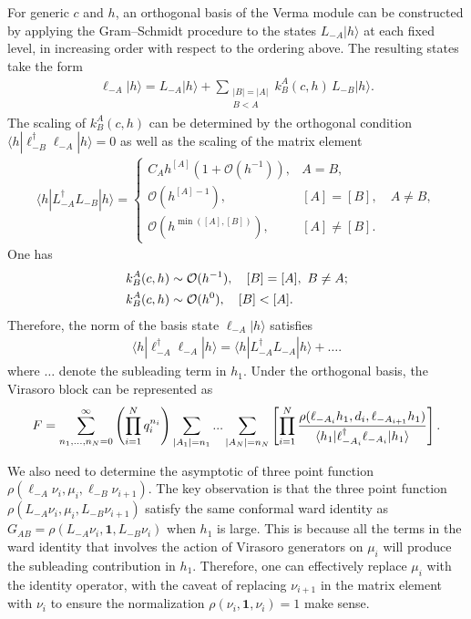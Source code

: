 \documentclass[12pt]{article}
\newcommand{\ie}{\begin{equation}\begin{aligned}}
\newcommand{\fe}{\end{aligned}\end{equation}}
\numberwithin{equation}{section}
\begin{document}
For generic $c$ and $h$, an orthogonal basis of the Verma module
can be constructed by applying the Gram--Schmidt procedure to the
states $L_{-A}|h\rangle$ at each fixed level, in increasing order
with respect to the ordering above. The resulting states take the form
\ie\label{orthob}
\ell_{-A}|h\rangle
=
L_{-A}|h\rangle
+
\sum_{\substack{|B|=|A|\\ B<A}}
k^A_B(c,h)\,L_{-B}|h\rangle.
\fe
The scaling of $k^A_B(c,h)$ can be determined by the orthogonal condition $\langle h| \ell_{-B}^\dagger \ell_{-A} |h\rangle =0$ as well as the scaling of the matrix element 
\ie\label{gram-scaling}
\langle h|L_{-A}^{\dagger}L_{-B}|h\rangle
=
\begin{cases}
C_A h^{[A]}\left(1+\mathcal{O}(h^{-1})\right),
& A=B,\\[4pt]
\mathcal{O}\!\left(h^{[A]-1}\right),
& [A]=[B],\quad A\neq B,\\[4pt]
\mathcal{O}\!\left(h^{\min([A],[B])}\right),
& [A]\neq[B].
\end{cases}
\fe
One has
\ie\label{kscaling}
&k^A_B(c,h) \sim {\cal O}(h^{-1}),~~~ [B]=[A],~B\not=A;
\\
& k^A_B(c,h) \sim {\cal O}(h^0),~~~ [B]<[A].
\fe
Therefore, the norm of the basis state $\ell_{-A}|h\rangle$ satisfies
\ie
\langle h| \ell_{-A}^\dagger \ell_{-A} |h\rangle =\langle h| L_{-A}^\dagger L_{-A} |h\rangle +\dots.
\fe
where $\dots$ denote the subleading term in $h_1$. Under the orthogonal basis, the Virasoro block can be represented as 
\ie\label{hlimit}
F= \sum_{n_1,...,n_N=0}^{\infty}\left(\prod_{i=1}^{N}q_i^{n_i}\right)\sum_{|A_1|=n_1}...\sum_{|A_N|=n_N}\left[\prod_{i=1}^N{\rho(\ell_{-A_i}h_1,d_i,\ell_{-A_{i+1}}h_1)\over\langle h_1|\ell_{-A_i}^\dag\ell_{-A_i}|h_1\rangle}\right].
\fe

We also need to determine the asymptotic of three point function  $\rho(\ell_{-A}\nu_i,\mu_i,\ell_{-B}\nu_{i+1})$. The key observation is that the three point function $\rho(L_{-A}\nu_i,\mu_i,L_{-B}\nu_{i+1})$ satisfy the same conformal ward identity as $G_{AB}=\rho(L_{-A}\nu_i,\mathbf{1},L_{-B}\nu_{i})$  when $h_1$ is large. This is because all the terms in the ward identity that involves the action of Virasoro generators on $\mu_i$ will produce the subleading contribution in $h_1$. Therefore, one can effectively replace $\mu_i$ with the identity operator, with the caveat of replacing $\nu_{i+1}$ in the matrix element with $\nu_i$ to ensure the normalization $\rho(\nu_i , \mathbf{1},\nu_i)=1$ make sense.
\end{document}

